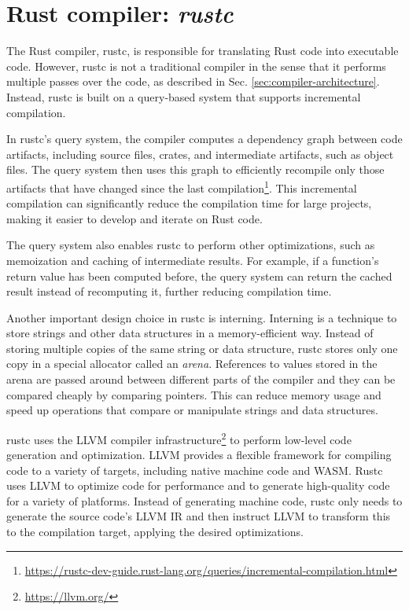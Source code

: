 \documentclass[../Thesis.tex]{subfiles}
\begin{document}
\section{Rust compiler: \emph{rustc}}

The Rust compiler, rustc, is responsible for translating Rust code into executable code.
However, rustc is not a traditional compiler in the sense
that it performs multiple passes over the code,
as described in Sec. \ref{sec:compiler-architecture}.
Instead, rustc is built on a query-based system that supports incremental compilation.

In rustc's query system, the compiler computes a dependency graph between code artifacts,
including source files, crates, and intermediate artifacts, such as object files.
The query system then uses this graph to efficiently recompile
only those artifacts that have changed since the last
compilation\footnote{\url{https://rustc-dev-guide.rust-lang.org/queries/incremental-compilation.html}}.
This incremental compilation can significantly
reduce the compilation time for large projects,
making it easier to develop and iterate on Rust code.

The query system also enables rustc to perform other optimizations,
such as memoization and caching of intermediate results.
For example, if a function's return value has been computed before,
the query system can return the cached result instead of recomputing it,
further reducing compilation time.

Another important design choice in rustc is interning.
Interning is a technique to store strings and
other data structures in a memory-efficient way.
Instead of storing multiple copies of the same string or data structure,
rustc stores only one copy in a special allocator called an \emph{arena}.
References to values stored in the arena are passed around between different parts
of the compiler and they can be compared cheaply by comparing pointers.
This can reduce memory usage and speed up operations
that compare or manipulate strings and data structures.

rustc uses the LLVM compiler infrastructure\footnote{\url{https://llvm.org/}}
to perform low-level code generation and optimization.
LLVM provides a flexible framework for compiling code
to a variety of targets, including native machine code and \acrfull{WASM}.
Rustc uses LLVM to optimize code for performance and
to generate high-quality code for a variety of platforms.
Instead of generating machine code, rustc only needs
to generate the source code's LLVM \acrfull{IR}
and then instruct LLVM to transform this to the compilation target,
applying the desired optimizations.
\end{document}
